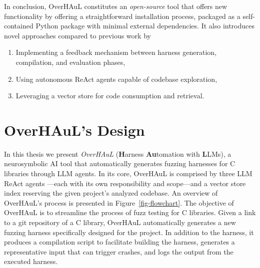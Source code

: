 \documentclass[
  a4paper,
  DIV=11,
  numbers=noendperiod]{scrreprt}
\providecommand{\tightlist}{%
  \setlength{\itemsep}{0pt}\setlength{\parskip}{0pt}}
\theoremstyle{definition}
\theoremstyle{remark}
\begin{document}
In conclusion, OverHAuL constitutes an \emph{open-source} tool that
offers new functionality by offering a straightforward installation
process, packaged as a self-contained Python package with minimal
external dependencies. It also introduces novel approaches compared to
previous work by

\begin{enumerate}
\def\labelenumi{\arabic{enumi}.}
\tightlist
\item
  Implementing a feedback mechanism between harness generation,
  compilation, and evaluation phases,
\item
  Using autonomous ReAct agents capable of codebase exploration,
\item
  Leveraging a vector store for code consumption and retrieval.
\end{enumerate}


\chapter{OverHAuL's Design}\label{overhauls-design}

In this thesis we present \emph{OverHAuL} (\textbf{H}arness
\textbf{Au}tomation with \textbf{L}LMs), a neurosymbolic AI tool that
automatically generates fuzzing harnesses for C libraries through LLM
agents. In its core, OverHAuL is comprised by three LLM ReAct agents
\autocite{reAct}---each with its own responsibility and scope---and a
vector store index reserving the given project's analyzed codebase. An
overview of OverHAuL's process is presented in
Figure~\ref{fig-flowchart}. The objective of OverHAuL is to streamline
the process of fuzz testing for C libraries. Given a link to a git
repository \autocite{torvalds2005} of a C library, OverHAuL
automatically generates a new fuzzing harness specifically designed for
the project. In addition to the harness, it produces a compilation
script to facilitate building the harness, generates a representative
input that can trigger crashes, and logs the output from the executed
harness.
\end{document}
